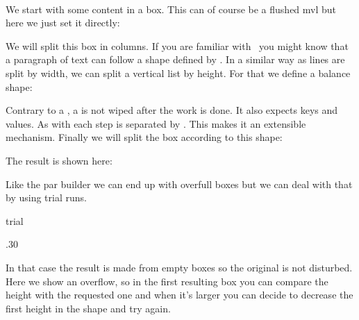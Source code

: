\startbuffer[three]
\setbox\scratchboxtwo\vbalance\scratchboxone
\stopbuffer

\startbuffer[four]
\hbox \bgroup
    \localcontrolledendless {%
        \ifvoid\scratchboxtwo
            \expandafter\quitloop
        \else
            \setbox\scratchbox\ruledhbox\bgroup
                \vbalancedbox\scratchboxtwo
            \egroup
            \vbox to 12\lineheight \bgroup
                \box\scratchbox
                \vfill
            \egroup
            \hskip1em
        \fi
    }\unskip
\egroup
\stopbuffer

We start with some content in a box. This can of course be a flushed
mvl but here we just set it directly:

\typebuffer[one][option=TEX]

We will split this box in columns. If you are familiar with \TEX\ you might know
that a paragraph of text can follow a shape defined by \type {\parshape}. In a
similar way as lines are split by width, we can split a vertical list by height.
For that we define a balance shape:

\typebuffer[two][option=TEX]

\typebuffer[three][option=TEX]

Contrary to a \type {\parshape}, a \type {\balanceshape} is not wiped after the
work is done. It also expects keys and values. As with \type {\parpasses} each
step is separated by . This makes it an extensible mechanism. Finally
we will split the box according to this shape:

\typebuffer[four][option=TEX]

The result is shown here:

\startlinecorrection
    \small
\stoplinecorrection

Like the par builder we can end up with overfull boxes but we can deal with that
by using trial runs.

\starttyping[option=TEX]
\setbox\scratchboxtwo\vbalance\scratchboxone trial
\stoptyping

\startbuffer[one]
\setbox\scratchboxone\vbox\bgroup
    \hsize.30\hsize
     \blank
     \blank
\egroup
\stopbuffer

In that case the result is made from empty boxes so the original is not
disturbed. Here we show an overflow, so in the first resulting box you
can compare the height with the requested one and when it's larger you
can decide to decrease the first height in the shape and try again.

